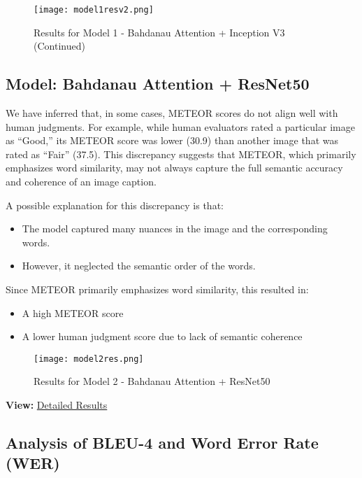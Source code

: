 \documentclass{article}
\begin{document}
\begin{figure}[htbp]
    \centering
    \texttt{[image: model1resv2.png]}
    \caption{Results for Model 1 - Bahdanau Attention + Inception V3 (Continued)}
    \label{fig:model1_res2}
\end{figure}

\subsection{Model: Bahdanau Attention + ResNet50}

We have inferred that, in some cases, METEOR scores do not align well with human judgments. For example, while human evaluators rated a particular image as “Good,” its METEOR score was lower (30.9) than another image that was rated as “Fair” (37.5). This discrepancy suggests that METEOR, which primarily emphasizes word similarity, may not always capture the full semantic accuracy and coherence of an image caption.

A possible explanation for this discrepancy is that:
\begin{itemize}
    \item The model captured many nuances in the image and the corresponding words.
    \item However, it neglected the semantic order of the words.
\end{itemize}
Since METEOR primarily emphasizes word similarity, this resulted in:
\begin{itemize}
    \item A high METEOR score
    \item A lower human judgment score due to lack of semantic coherence
\end{itemize}

\begin{figure}[htbp]
    \centering
    \texttt{[image: model2res.png]}
    \caption{Results for Model 2 - Bahdanau Attention + ResNet50}
    \label{fig:model2_res}
\end{figure}

\noindent\textbf{View:} \href{https://github.com/HemanthTejaY/Image-Captioning-A-Comparative-Study/blob/main/Attention%2BResNet%20Results/attentionResNetResults.pdf}{Detailed Results}

\subsection{Analysis of BLEU-4 and Word Error Rate (WER)}
\end{document}
